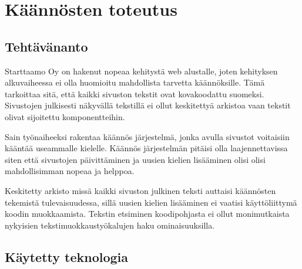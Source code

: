 \documentclass[11pt,a4paper,titlepage,oneside]{article}
\begin{document}
\newpage






\section{Käännösten toteutus}




\subsection{Tehtävänanto}


Starttaamo Oy on hakenut nopeaa kehitystä web alustalle, joten kehityksen alkuvaiheessa 
ei olla huomioitu mahdollista tarvetta käännöksille. 
Tämä tarkoittaa sitä, että kaikki sivuston tekstit ovat kovakoodattu suomeksi.
Sivustojen julkisesti näkyvällä tekstillä ei ollut keskitettyä arkistoa vaan tekstit olivat sijoitettu komponentteihin.
\medskip

Sain työnaiheeksi rakentaa käännös järjestelmä, jonka avulla sivustot voitaisiin kääntää useammalle kielelle.
Käännös järjestelmän pitäisi olla laajennettavissa siten että sivustojen päivittäminen ja uusien kielien lisääminen olisi 
olisi mahdollisimman nopeaa ja helppoa.\\
\medskip

Keskitetty arkisto missä kaikki sivuston julkinen teksti auttaisi käännösten tekemistä tulevaisuudessa,
sillä uusien kielien lisääminen ei vaatisi käyttöliittymä koodin muokkaamista.
Tekstin etsiminen koodipohjasta ei ollut monimutkaista nykyisien tekstimuokkaustyökalujen haku ominaisuuksilla.







\subsection{Käytetty teknologia}


\end{document}
